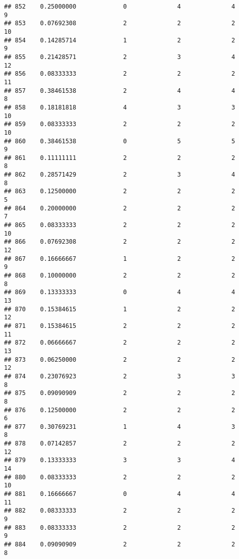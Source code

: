 \documentclass[
]{article}
\begin{document}
\begin{verbatim}
## 852    0.25000000             0              4              4              9
## 853    0.07692308             2              2              2             10
## 854    0.14285714             1              2              2              9
## 855    0.21428571             2              3              4             12
## 856    0.08333333             2              2              2             11
## 857    0.38461538             2              4              4              8
## 858    0.18181818             4              3              3             10
## 859    0.08333333             2              2              2             10
## 860    0.38461538             0              5              5              9
## 861    0.11111111             2              2              2              8
## 862    0.28571429             2              3              4              8
## 863    0.12500000             2              2              2              5
## 864    0.20000000             2              2              2              7
## 865    0.08333333             2              2              2             10
## 866    0.07692308             2              2              2             12
## 867    0.16666667             1              2              2              9
## 868    0.10000000             2              2              2              8
## 869    0.13333333             0              4              4             13
## 870    0.15384615             1              2              2             12
## 871    0.15384615             2              2              2             11
## 872    0.06666667             2              2              2             13
## 873    0.06250000             2              2              2             12
## 874    0.23076923             2              3              3              8
## 875    0.09090909             2              2              2              8
## 876    0.12500000             2              2              2              6
## 877    0.30769231             1              4              3              8
## 878    0.07142857             2              2              2             12
## 879    0.13333333             3              3              4             14
## 880    0.08333333             2              2              2             10
## 881    0.16666667             0              4              4             11
## 882    0.08333333             2              2              2              9
## 883    0.08333333             2              2              2              9
## 884    0.09090909             2              2              2              8

\end{verbatim}
\end{document}
